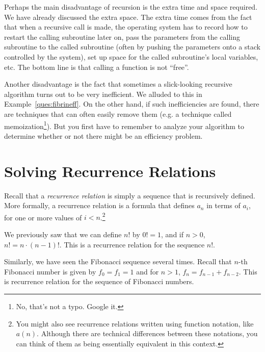Perhaps the main disadvantage of recursion is the extra time and space
required.
We have already discussed the extra space.  
The extra time comes from the fact that when a recursive call is made,
the operating system has to record how to restart the calling subroutine later on,
pass the parameters from the calling subroutine to the called
subroutine (often by pushing the parameters onto a stack controlled by the system),
set up space for the called subroutine's local variables, etc.
The bottom line is that calling a function is not ``free''.  

Another disadvantage is the fact that sometimes a slick-looking recursive algorithm 
turns out to be very inefficient.  We alluded to this in Example~\ref{ques:fibrineff}.
On the other hand, if such inefficiencies are found, there are techniques
that can often easily remove them 
(e.g. a technique called memoization\footnote{No, that's not a typo.  Google it.}).
But you first have to remember to analyze 
your algorithm to determine whether or not there might be an efficiency problem.

\newpage

\section{Solving Recurrence Relations}\label{sec:recRel}
Recall that a {\em recurrence relation}
is simply a sequence that is recursively defined.
More formally, a recurrence relation is a formula that defines $a_n$ 
in terms of $a_i$, for one or more values of $i<n$.\footnote{You might also see recurrence relations
written using function notation, like $a(n)$.
Although there are technical differences between these notations, you can think of them as
being essentially equivalent in this context.}

\begin{exa}
We previously saw that we can define $n!$ by $0!=1$, and if $n>0$, $n!=n\cdot(n-1)!$.
This is a recurrence relation for the sequence $n!$.

Similarly, we have seen the Fibonacci sequence several times.
Recall that $n$-th Fibonacci number is given by $f_0=f_1=1$ and for $n>1$, 
$f_n=f_{n-1}+f_{n-2}$.  This is recurrence relation for the sequence of Fibonacci numbers.
\end{exa}

